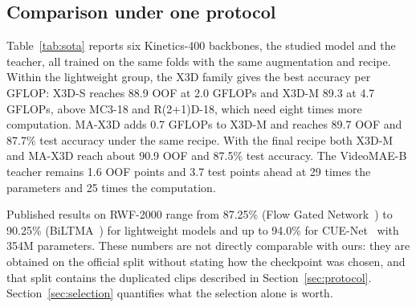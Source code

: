 \documentclass[conference]{IEEEtran}
\begin{document}
\subsection{Comparison under one protocol}

Table~\ref{tab:sota} reports six Kinetics-400 backbones, the studied model and the
teacher, all trained on the same folds with the same augmentation and
recipe. Within the lightweight group, the X3D family gives the best
accuracy per GFLOP: X3D-S reaches 88.9 OOF at 2.0 GFLOPs and X3D-M 89.3 at
4.7 GFLOPs, above MC3-18 and R(2+1)D-18, which need eight times more
computation. MA-X3D adds 0.7 GFLOPs to X3D-M and reaches 89.7 OOF and
87.7\% test accuracy under the same recipe. With the final recipe both
X3D-M and MA-X3D reach about 90.9 OOF and 87.5\% test accuracy. The
VideoMAE-B teacher remains 1.6 OOF points and 3.7 test points ahead at 29
times the parameters and 25 times the computation.

Published results on RWF-2000 range from 87.25\% (Flow Gated
Network~\cite{rwf2000}) to 90.25\% (BiLTMA~\cite{biltma}) for lightweight
models and up to 94.0\% for CUE-Net~\cite{cuenet} with 354M parameters.
These numbers are not directly comparable with ours: they are obtained on
the official split without stating how the checkpoint was chosen, and that
split contains the duplicated clips described in
Section~\ref{sec:protocol}. Section~\ref{sec:selection} quantifies what
the selection alone is worth.
\end{document}
